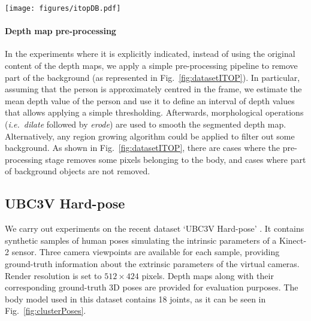 \documentclass[review,12pt,3p]{elsarticle}
\def \ie{\textit{i.e.}}
\begin{document}
\begin{figure*}[tb]
\centering
   \texttt{[image: figures/itopDB.pdf]}
   \caption{\textbf{Samples extracted from ITOP dataset}. Each block correspond to a camera viewpoint: \textit{frontal} and \textit{top}. Each block contains, from top to bottom: full-frame depth map ($320 \times 240$ pixels); pre-processed depth map (\ie~actual input for the network: $100\times 100$ pixels); and, ground-truth pose.}
   \label{fig:datasetITOP}
\end{figure*}

\paragraph{Depth map pre-processing}
In the experiments where it is explicitly indicated, instead of using the original content of the depth maps, we apply a simple pre-processing pipeline to remove part of the background (as represented in Fig.~\ref{fig:datasetITOP}).
In particular, assuming that the person is approximately centred in the frame, we estimate the mean depth value of the person and use it to define an interval of depth values that allows applying a simple thresholding. Afterwards, morphological operations (\ie~\textit{dilate} followed by \textit{erode}) are used to smooth the segmented depth map. 
Alternatively, any region growing algorithm could be applied to filter out some background.
As shown in Fig.~\ref{fig:datasetITOP}, there are cases where the pre-processing stage removes some pixels belonging to the body, and cases where part of background objects are not removed. 

\subsection{UBC3V Hard-pose} \label{subsec:dataubc3v}
We carry out experiments on the recent dataset `UBC3V Hard-pose' \citep{Shafaei16}.
It contains synthetic samples of human poses simulating the intrinsic parameters of a Kinect-2 sensor. Three camera viewpoints are available for each sample, providing ground-truth information about the extrinsic parameters of the virtual cameras. Render resolution is set to $512 \times 424$ pixels. %
Depth maps along with their corresponding ground-truth 3D poses are provided for evaluation purposes. The body model used in this dataset contains 18 joints, as it can be seen in Fig.~\ref{fig:clusterPoses}.
\end{document}
